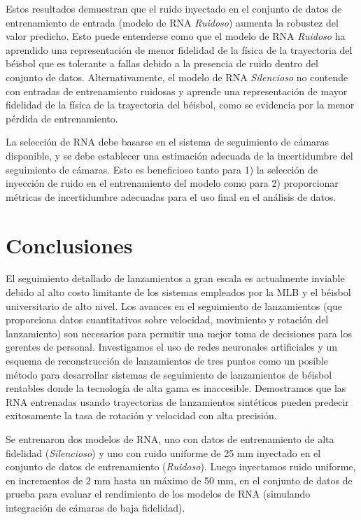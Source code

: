 \documentclass[12pt,a4paper]{article}
\begin{document}
Estos resultados demuestran que el ruido inyectado en el conjunto de datos de entrenamiento de entrada (modelo de RNA \textit{Ruidoso}) aumenta la robustez del valor predicho. Esto puede entenderse como que el modelo de RNA \textit{Ruidoso} ha aprendido una representación de menor fidelidad de la física de la trayectoria del béisbol que es tolerante a fallas debido a la presencia de ruido dentro del conjunto de datos. Alternativamente, el modelo de RNA \textit{Silencioso} no contende con entradas de entrenamiento ruidosas y aprende una representación de mayor fidelidad de la física de la trayectoria del béisbol, como se evidencia por la menor pérdida de entrenamiento.

La selección de RNA debe basarse en el sistema de seguimiento de cámaras disponible, y se debe establecer una estimación adecuada de la incertidumbre del seguimiento de cámaras. Esto es beneficioso tanto para 1) la selección de inyección de ruido en el entrenamiento del modelo como para 2) proporcionar métricas de incertidumbre adecuadas para el uso final en el análisis de datos.

\section{Conclusiones}

El seguimiento detallado de lanzamientos a gran escala es actualmente inviable debido al alto costo limitante de los sistemas empleados por la MLB y el béisbol universitario de alto nivel. Los avances en el seguimiento de lanzamientos (que proporciona datos cuantitativos sobre velocidad, movimiento y rotación del lanzamiento) son necesarios para permitir una mejor toma de decisiones para los gerentes de personal. Investigamos el uso de redes neuronales artificiales y un esquema de reconstrucción de lanzamientos de tres puntos como un posible método para desarrollar sistemas de seguimiento de lanzamientos de béisbol rentables donde la tecnología de alta gama es inaccesible. Demostramos que las RNA entrenadas usando trayectorias de lanzamientos sintéticos pueden predecir exitosamente la tasa de rotación y velocidad con alta precisión.

Se entrenaron dos modelos de RNA, uno con datos de entrenamiento de alta fidelidad (\textit{Silencioso}) y uno con ruido uniforme de 25 mm inyectado en el conjunto de datos de entrenamiento (\textit{Ruidoso}). Luego inyectamos ruido uniforme, en incrementos de 2 mm hasta un máximo de 50 mm, en el conjunto de datos de prueba para evaluar el rendimiento de los modelos de RNA (simulando integración de cámaras de baja fidelidad).
\end{document}
